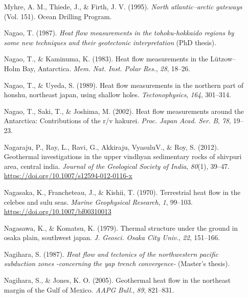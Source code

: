\begin{CSLReferences}{1}{1}
\leavevmode{}%
Myhre, A. M., Thiede, J., \& Firth, J. V. (1995). \emph{North atlantic--arctic gateways} (Vol. 151). Ocean Drilling Program.

\leavevmode{}%
Nagao, T. (1987). \emph{Heat flow measurements in the tohoku-hokkaido regions by some new techniques and their geotectonic interpretation} (PhD thesis).

\leavevmode{}%
Nagao, T., \& Kaminuma, K. (1983). Heat flow measurements in the {Lützow--Holm Bay, Antarctica}. \emph{Mem. Nat. Inst. Polar Res.}, \emph{28}, 18--26.

\leavevmode{}%
Nagao, T., \& Uyeda, S. (1989). Heat flow measurements in the northern part of honshu, northeast japan, using shallow holes. \emph{Tectonophysics}, \emph{164}, 301--314.

\leavevmode{}%
Nagao, T., Saki, T., \& Joshima, M. (2002). Heat flow measurements around the {Antarctica}: Contributions of the r/v hakurei. \emph{Proc. Japan Acad. Ser. B}, \emph{78}, 19--23.

\leavevmode{}%
Nagaraju, P., Ray, L., Ravi, G., Akkiraju, VyasuluV., \& Roy, S. (2012). Geothermal investigations in the upper vindhyan sedimentary rocks of shivpuri area, central india. \emph{Journal of the Geological Society of India}, \emph{80}(1), 39--47. \url{https://doi.org/10.1007/s12594-012-0116-x}

\leavevmode{}%
Nagasaka, K., Francheteau, J., \& Kishii, T. (1970). Terrestrial heat flow in the celebes and sulu seas. \emph{Marine Geophysical Research}, \emph{1}, 99--103. \url{https://doi.org/10.1007/bf00310013}

\leavevmode{}%
Nagasawa, K., \& Komatsu, K. (1979). Thermal structure under the ground in osaka plain, southwest japan. \emph{J. Geosci. Osaka City Univ.}, \emph{22}, 151--166.

\leavevmode{}%
Nagihara, S. (1987). \emph{Heat flow and tectonics of the northwestern pacific subduction zones -concerning the yap trench convergence-} (Master's thesis).

\leavevmode{}%
Nagihara, S., \& Jones, K. O. (2005). Geothermal heat flow in the northeast margin of the {Gulf of Mexico}. \emph{AAPG Bull.}, \emph{89}, 821--831.


\end{CSLReferences}
